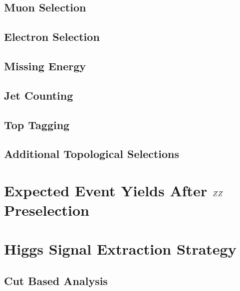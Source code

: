 \documentclass{cmspaper}
\begin{document}
  \subsection{Muon Selection} 
    \label{sec:sel_muons}
   
  \subsection{Electron Selection} 
    \label{sec:sel_electrons}
    
  \subsection{Missing Energy} 
    \label{sec:sel_met}
    
  \subsection{Jet Counting} 
    \label{sec:sel_jets}
    
  \subsection{Top Tagging}
    \label{sec:sel_toptag}
    
  \subsection{Additional Topological Selections}
    \label{sec:sel_other}
    

\clearpage

\section{Expected Event Yields After $ZZ$ Preselection}
  \label{sec:yields_mc}
  
\clearpage    

\section{Higgs Signal Extraction Strategy}
  
  \label{sec:signal_selection}
  \subsection{Cut Based Analysis}
    \label{sec:anal_cutbased}
    
\end{document}
